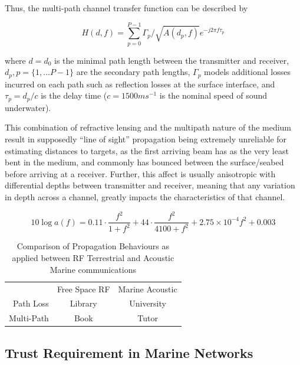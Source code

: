\documentclass[runningheads,a4paper]{llncs}
\begin{document}
Thus, the multi-path channel transfer function can be described by 

\begin{equation}
  \label{eq:acomultipath}
  H(d,f) = \sum_{p=0}^{P-1} \Gamma_p / \sqrt{A(d_p,f)}e^{-j 2 \pi f \tau_p}
\end{equation}

where $d=d_0$ is the minimal path length between the transmitter and receiver, $d_p,p=\{1,\dots P-1\}$ are the secondary path lengths, $\Gamma_p$ models additional losses incurred on each path such as reflection losses at the surface interface, and $\tau_p = d_p/c$ is the delay time ($c = 1500 ms^{-1}$ is the nominal speed of sound underwater).


This combination of refractive lensing and the multipath nature of the medium result in supposedly ``line of sight'' propagation being extremely unreliable for estimating distances to targets, as the first arriving beam has as the very least bent in the medium, and commonly has bounced between the surface/seabed before arriving at a receiver. Further, this affect is usually anisotropic with differential depths between transmitter and receiver, meaning that any variation in depth across a channel, greatly impacts the characteristics of that channel.

\begin{equation}
  \label{eq:thorp}
  10 \log a(f) = 0.11 \cdot \frac{f^2}{1+f^2} + 44\cdot\frac{f^2}{4100+f^2}+ 2.75\times10^{-4} f^2 + 0.003
\end{equation}

\begin{table}[h]
  \caption{Comparison of Propagation Behaviours as applied between RF Terrestrial and Acoustic Marine communications} \label{tab:propconstraints}
  \begin{center}
    \begin{tabular}{ r|c|c| }
      \multicolumn{1}{r}{}
      &  \multicolumn{1}{c}{Free Space RF}
      & \multicolumn{1}{c}{Marine Acoustic} \\
      \cline{2-3}
      Path Loss & Library & University \\
      \cline{2-3}
      Multi-Path & Book & Tutor \\
      \cline{2-3}
    \end{tabular}
  \end{center}
\end{table}

\subsection{Trust Requirement in Marine Networks}
\end{document}
